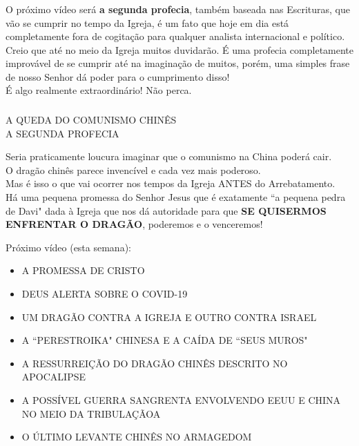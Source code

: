 \documentclass[aspectratio=169]{beamer}
\begin{document}
	
\begin{frame}
	  \frametitle{}
	  \framesubtitle{}
	    \centering
			O próximo vídeo será \textbf{a segunda profecia}, também baseada nas Escrituras, que vão se cumprir no tempo da Igreja, é um fato que hoje em dia está completamente fora de cogitação para qualquer analista internacional e político. Creio que até no meio da Igreja muitos duvidarão. É uma profecia completamente improvável de se cumprir até na imaginação de muitos, porém, uma simples frase de nosso Senhor dá poder para o cumprimento disso!\\
		\vspace{.5cm}
	É algo realmente extraordinário! Não perca.\\
	\end{frame}
	
	
\begin{frame}
	  \frametitle{}
	  \framesubtitle{}
	    \centering
	  \begin{center}	  
  {\LARGE A QUEDA DO COMUNISMO CHINÊS}\\
  A SEGUNDA PROFECIA\\
	  \end{center}
    \vspace{.5cm}
  Seria praticamente loucura imaginar que o comunismo na China poderá cair. \\
  O dragão chinês parece invencível e cada vez mais poderoso.\\
  \vspace{.5cm}
  Mas é isso o que vai ocorrer nos tempos da Igreja ANTES do Arrebatamento.\\
  Há uma pequena promessa do Senhor Jesus que é exatamente ``a pequena pedra de Davi" dada à Igreja que nos dá autoridade para que \textbf{SE QUISERMOS ENFRENTAR O DRAGÃO}, poderemos e o venceremos!\\
\end{frame}
	
	
	\begin{frame}
	  Próximo vídeo (esta semana):
  \vspace{.5cm}
  \begin{itemize}
    \item A PROMESSA DE CRISTO\\
    \item DEUS ALERTA SOBRE O COVID-19\\
    \item UM DRAGÃO CONTRA A IGREJA E OUTRO CONTRA ISRAEL\\
    \item A ``PERESTROIKA" CHINESA E A CAÍDA DE ``SEUS MUROS"\\
    \item A RESSURREIÇÃO DO DRAGÃO CHINÊS DESCRITO NO APOCALIPSE\\
    \item A POSSÍVEL GUERRA SANGRENTA ENVOLVENDO EEUU E CHINA NO MEIO DA TRIBULAÇÃOA\\
    \item O ÚLTIMO LEVANTE CHINÊS NO ARMAGEDOM\\
  \end{itemize}
	\end{frame}
	
\end{document}
